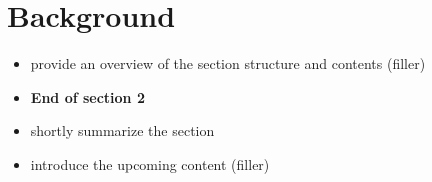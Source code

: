 \section{Background}

\begin{itemize}
  \item provide an overview of the section structure and contents (filler)
\end{itemize}





\begin{itemize}
  \item \textbf{End of section 2}
  \item shortly summarize the section
  \item introduce the upcoming content (filler)
\end{itemize}
